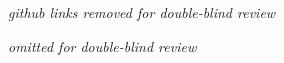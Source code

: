 \documentclass[10pt,times,numbers]{sigplanconf}
\begin{document}

{\em github links removed for double-blind review}
%




%

\acks

{\em omitted for double-blind review}



{}
\end{document}
